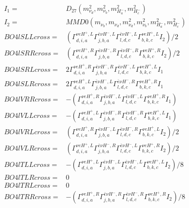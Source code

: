 \documentclass[A4,landscape]{article}
\begin{document}
\begin{align} 
I_1 = & D_{27}(m^2_{\nu_{{d}}}, m^2_{\nu_{{b}}}, m^2_{H^-_{{a}}}, m^2_{H^-_{{c}}}) \\ 
I_2 = & MMD0(m_{\nu_{{b}}}, m_{\nu_{{d}}}, m^2_{\nu_{{d}}}, m^2_{\nu_{{b}}}, m^2_{H^-_{{a}}}, m^2_{H^-_{{c}}}) \\ 
  BO4lSLLcross= & ( \Gamma^{\nu e H^+,L}_{d, i, a} \Gamma^{\bar{e}\nu H^- ,L}_{j, b, a} \Gamma^{\bar{e}\nu H^- ,L}_{l, d, c} \Gamma^{\nu e H^+,L}_{b, k, c} I_2)/2 \\ 
  BO4lSRRcross= & ( \Gamma^{\nu e H^+,R}_{d, i, a} \Gamma^{\bar{e}\nu H^- ,R}_{j, b, a} \Gamma^{\bar{e}\nu H^- ,R}_{l, d, c} \Gamma^{\nu e H^+,R}_{b, k, c} I_2)/2 \\ 
  BO4lSRLcross= & 2  \Gamma^{\nu e H^+,R}_{d, i, a} \Gamma^{\bar{e}\nu H^- ,R}_{j, b, a} \Gamma^{\bar{e}\nu H^- ,L}_{l, d, c} \Gamma^{\nu e H^+,L}_{b, k, c} I_1 \\ 
  BO4lSLRcross= & 2  \Gamma^{\nu e H^+,L}_{d, i, a} \Gamma^{\bar{e}\nu H^- ,L}_{j, b, a} \Gamma^{\bar{e}\nu H^- ,R}_{l, d, c} \Gamma^{\nu e H^+,R}_{b, k, c} I_1 \\ 
  BO4lVRRcross= & -( \Gamma^{\nu e H^+,R}_{d, i, a} \Gamma^{\bar{e}\nu H^- ,L}_{j, b, a} \Gamma^{\bar{e}\nu H^- ,L}_{l, d, c} \Gamma^{\nu e H^+,R}_{b, k, c} I_1) \\ 
  BO4lVLLcross= & -( \Gamma^{\nu e H^+,L}_{d, i, a} \Gamma^{\bar{e}\nu H^- ,R}_{j, b, a} \Gamma^{\bar{e}\nu H^- ,R}_{l, d, c} \Gamma^{\nu e H^+,L}_{b, k, c} I_1) \\ 
  BO4lVRLcross= & ( \Gamma^{\nu e H^+,R}_{d, i, a} \Gamma^{\bar{e}\nu H^- ,L}_{j, b, a} \Gamma^{\bar{e}\nu H^- ,R}_{l, d, c} \Gamma^{\nu e H^+,L}_{b, k, c} I_2)/2 \\ 
  BO4lVLRcross= & ( \Gamma^{\nu e H^+,L}_{d, i, a} \Gamma^{\bar{e}\nu H^- ,R}_{j, b, a} \Gamma^{\bar{e}\nu H^- ,L}_{l, d, c} \Gamma^{\nu e H^+,R}_{b, k, c} I_2)/2 \\ 
  BO4lTLLcross= & -( \Gamma^{\nu e H^+,L}_{d, i, a} \Gamma^{\bar{e}\nu H^- ,L}_{j, b, a} \Gamma^{\bar{e}\nu H^- ,L}_{l, d, c} \Gamma^{\nu e H^+,L}_{b, k, c} I_2)/8 \\ 
  BO4lTLRcross= & 0 \\ 
  BO4lTRLcross= & 0 \\ 
  BO4lTRRcross= & -( \Gamma^{\nu e H^+,R}_{d, i, a} \Gamma^{\bar{e}\nu H^- ,R}_{j, b, a} \Gamma^{\bar{e}\nu H^- ,R}_{l, d, c} \Gamma^{\nu e H^+,R}_{b, k, c} I_2)/8 \\ 
\end{align} 
\end{document}
